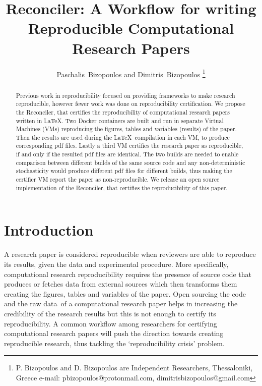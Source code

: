 \documentclass[journal]{IEEEtran}
\begin{document}

\title{Reconciler: A Workflow for writing Reproducible Computational Research Papers}

\author{Paschalis~Bizopoulos and Dimitris~Bizopoulos
\thanks{P. Bizopoulos and D. Bizopoulos are Independent Researchers, Thessaloniki, Greece e-mail: pbizopoulos@protonmail.com, dimitrisbizopoulos@gmail.com}}

\maketitle

\begin{abstract}
	Previous work in reproducibility focused on providing frameworks to make research reproducible, however fewer work was done on reproducibility certification.
	We propose the Reconciler, that certifies the reproducibility of computational research papers written in \LaTeX.
	Two Docker containers are built and run in separate Virtual Machines (VMs) reproducing the figures, tables and variables (results) of the paper.
	Then the results are used during the \LaTeX\ compilation in each VM, to produce corresponding pdf files.
	Lastly a third VM certifies the research paper as reproducible, if and only if the resulted pdf files are identical.
	The two builds are needed to enable comparison between different builds of the same source code and any non-deterministic stochasticity would produce different pdf files for different builds, thus making the certifier VM report the paper as non-reproducible.
	We release an open source implementation of the Reconciler, that certifies the reproducibility of this paper.
\end{abstract}

\section{Introduction}
A research paper is considered reproducible when reviewers are able to reproduce its results, given the data and experimental procedure.
More specifically, computational research reproducibility requires the presence of source code that produces or fetches data from external sources which then transforms them creating the figures, tables and variables of the paper.
Open sourcing the code and the raw data of a computational research paper helps in increasing the credibility of the research results but this is not enough to certify its reproducibility.
A common workflow among researchers for certifying computational research papers will push the direction towards creating reproducible research, thus tackling the `reproducibility crisis' problem.
\end{document}

